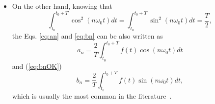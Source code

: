 \begin{itemize}
\item On the other hand, knowing that
  \begin{equation*}
    \int_{t_0}^{t_0+T} \cos^2(n\omega_0t)dt = \int_{t_0}^{t_0+T}
    \sin^2(n\omega_0t)dt = \frac{T}{2},
  \end{equation*}
  the Eqs. \ref{eq:an} and \ref{eq:bn} can be also written as
  \begin{equation}
    a_n = \frac{2}{T}\int_{t_0}^{t_0+T} f(t)\cos(n\omega_0t)dt
    \tag{anOK}
    \label{eq:anOK}
  \end{equation}
  and (\ref{eq:bnOK})
  \begin{equation}
    b_n = \frac{2}{T}\int_{t_0}^{t_0+T} f(t)\sin(n\omega_0t)dt,
    \tag{bnOK}
    \label{eq:bnOK}
  \end{equation}
  which is usually the most common in the literature~\cite{Lathi,Oppenheim}.
\end{itemize}

